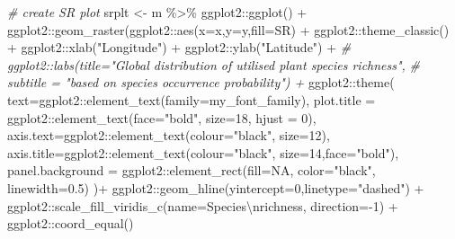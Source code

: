 \documentclass[
]{article}
\newenvironment{Shaded}{\begin{snugshade}}{\end{snugshade}}
\newcommand{\AttributeTok}[1]{\textcolor[rgb]{0.77,0.63,0.00}{#1}}
\newcommand{\CommentTok}[1]{\textcolor[rgb]{0.56,0.35,0.01}{\textit{#1}}}
\newcommand{\ConstantTok}[1]{\textcolor[rgb]{0.00,0.00,0.00}{#1}}
\newcommand{\DecValTok}[1]{\textcolor[rgb]{0.00,0.00,0.81}{#1}}
\newcommand{\FloatTok}[1]{\textcolor[rgb]{0.00,0.00,0.81}{#1}}
\newcommand{\FunctionTok}[1]{\textcolor[rgb]{0.00,0.00,0.00}{#1}}
\newcommand{\NormalTok}[1]{#1}
\newcommand{\OtherTok}[1]{\textcolor[rgb]{0.56,0.35,0.01}{#1}}
\newcommand{\SpecialCharTok}[1]{\textcolor[rgb]{0.00,0.00,0.00}{#1}}
\newcommand{\StringTok}[1]{\textcolor[rgb]{0.31,0.60,0.02}{#1}}
\begin{document}
\begin{Shaded}
\begin{Highlighting}[]
\CommentTok{\# create SR plot}
\NormalTok{srplt }\OtherTok{\textless{}{-}}\NormalTok{ m }\SpecialCharTok{\%\textgreater{}\%}
\NormalTok{  ggplot2}\SpecialCharTok{::}\FunctionTok{ggplot}\NormalTok{() }\SpecialCharTok{+}
\NormalTok{  ggplot2}\SpecialCharTok{::}\FunctionTok{geom\_raster}\NormalTok{(ggplot2}\SpecialCharTok{::}\FunctionTok{aes}\NormalTok{(}\AttributeTok{x=}\NormalTok{x,}\AttributeTok{y=}\NormalTok{y,}\AttributeTok{fill=}\NormalTok{SR) }\SpecialCharTok{+}
\NormalTok{  ggplot2}\SpecialCharTok{::}\FunctionTok{theme\_classic}\NormalTok{() }\SpecialCharTok{+}
\NormalTok{  ggplot2}\SpecialCharTok{::}\FunctionTok{xlab}\NormalTok{(}\StringTok{"Longitude"}\NormalTok{) }\SpecialCharTok{+}\NormalTok{ ggplot2}\SpecialCharTok{::}\FunctionTok{ylab}\NormalTok{(}\StringTok{"Latitude"}\NormalTok{) }\SpecialCharTok{+}
  \CommentTok{\# ggplot2::labs(title="Global distribution of utilised plant species richness",}
  \CommentTok{\#               subtitle = "based on species occurrence probability") +}
\NormalTok{  ggplot2}\SpecialCharTok{::}\FunctionTok{theme}\NormalTok{(}
    \AttributeTok{text=}\NormalTok{ggplot2}\SpecialCharTok{::}\FunctionTok{element\_text}\NormalTok{(}\AttributeTok{family=}\NormalTok{my\_font\_family),}
    \AttributeTok{plot.title =}\NormalTok{ ggplot2}\SpecialCharTok{::}\FunctionTok{element\_text}\NormalTok{(}\AttributeTok{face=}\StringTok{"bold"}\NormalTok{, }\AttributeTok{size=}\DecValTok{18}\NormalTok{, }\AttributeTok{hjust =} \DecValTok{0}\NormalTok{),}
    \AttributeTok{axis.text=}\NormalTok{ggplot2}\SpecialCharTok{::}\FunctionTok{element\_text}\NormalTok{(}\AttributeTok{colour=}\StringTok{"black"}\NormalTok{, }\AttributeTok{size=}\DecValTok{12}\NormalTok{),}
    \AttributeTok{axis.title=}\NormalTok{ggplot2}\SpecialCharTok{::}\FunctionTok{element\_text}\NormalTok{(}\AttributeTok{colour=}\StringTok{"black"}\NormalTok{, }\AttributeTok{size=}\DecValTok{14}\NormalTok{,}\AttributeTok{face=}\StringTok{"bold"}\NormalTok{),}
    \AttributeTok{panel.background =}\NormalTok{ ggplot2}\SpecialCharTok{::}\FunctionTok{element\_rect}\NormalTok{(}\AttributeTok{fill=}\ConstantTok{NA}\NormalTok{, }\AttributeTok{color=}\StringTok{"black"}\NormalTok{, }\AttributeTok{linewidth=}\FloatTok{0.5}\NormalTok{)}
\NormalTok{  )}\SpecialCharTok{+}
\NormalTok{  ggplot2}\SpecialCharTok{::}\FunctionTok{geom\_hline}\NormalTok{(}\AttributeTok{yintercept=}\DecValTok{0}\NormalTok{,}\AttributeTok{linetype=}\StringTok{"dashed"}\NormalTok{) }\SpecialCharTok{+} 
\NormalTok{  ggplot2}\SpecialCharTok{::}\FunctionTok{scale\_fill\_viridis\_c}\NormalTok{(}\AttributeTok{name=}\StringTok{\textquotesingle{}Species}\SpecialCharTok{\textbackslash{}n}\StringTok{richness\textquotesingle{}}\NormalTok{, }\AttributeTok{direction=}\SpecialCharTok{{-}}\DecValTok{1}\NormalTok{) }\SpecialCharTok{+}
\NormalTok{  ggplot2}\SpecialCharTok{::}\FunctionTok{coord\_equal}\NormalTok{()}


\end{Highlighting}
\end{Shaded}
\end{document}
